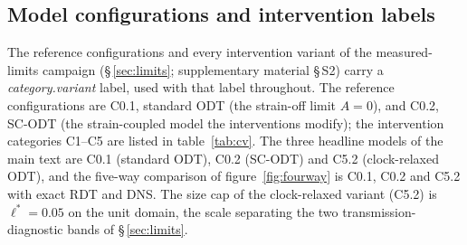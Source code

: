 \documentclass[lineno]{JFM-FLM_Au}
\begin{document}
\subsection{Model configurations and intervention labels}

The reference configurations and every intervention variant of the
measured-limits campaign (\S\,\ref{sec:limits}; supplementary material
\S\,S2) carry a \emph{category.variant} label, used with that label
throughout. The reference configurations are C0.1, standard ODT (the
strain-off limit $A=0$), and C0.2, SC-ODT (the strain-coupled model the
interventions modify); the intervention categories C1--C5 are listed in
table~\ref{tab:cv}. The three headline models of the main text are C0.1
(standard ODT), C0.2 (SC-ODT) and C5.2 (clock-relaxed ODT), and the
five-way comparison of figure~\ref{fig:fourway} is C0.1, C0.2 and C5.2
with exact RDT and DNS. The size cap of the clock-relaxed variant
(C5.2) is $\ell^*=0.05$ on the unit domain, the scale separating the
two transmission-diagnostic bands of \S\,\ref{sec:limits}.
\end{document}
